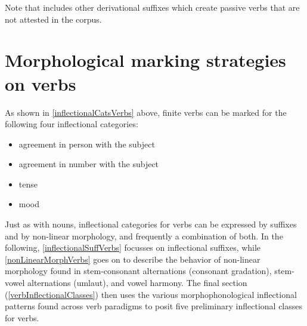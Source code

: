 Note that \citet{Ruong1945} includes other derivational suffixes which create passive verbs that are not attested in the corpus. 

\clearpage

\section{Morphological marking strategies on verbs}\label{markingVerbs}
As shown in \SEC\ref{inflectionalCatsVerbs} above, finite verbs can be marked for the following four inflectional categories: 
\begin{itemize}
\item{agreement in person with the subject}
\item{agreement in number with the subject}
\item{tense}
\item{mood}
\end{itemize}
Just as with nouns, inflectional categories for verbs can be expressed by suffixes and by non-linear morphology, and frequently a combination of both. In the following, \SEC\ref{inflectionalSuffVerbs} focusses on inflectional suffixes, while \SEC\ref{nonLinearMorphVerbs} goes on to describe the behavior of non-linear morphology found in stem-consonant alternations (consonant gradation), stem-vowel alternations (umlaut), %
and vowel harmony. The final section (\ref{verbInflectionalClasses}) then uses the various morphophonological inflectional patterns found across verb paradigms to posit five preliminary inflectional classes for verbs.

\newcommand{\Xp}[1]{\MC{1}{x{80pt}}{#1}}%

